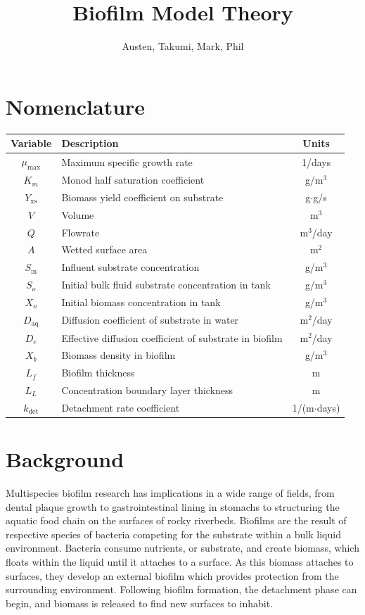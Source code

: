 \documentclass[letterpaper, twoside]{article}
\title{Biofilm Model Theory}
\author{Austen, Takumi, Mark, Phil}
\date{}
\numberwithin{equation}{section}
\begin{document}
\maketitle
{}

\section{Nomenclature}
\begin{tabular}{c l c}
  Variable & Description & Units\\ \hline
  $\mu_\mathrm{max}$  & Maximum specific growth rate & 1/days\\
  $K_m$ & Monod half saturation coefficient & g/m$^3$\\
  $Y_\mathrm{xs}$ & Biomass yield coefficient on substrate & g$\cdot$g/s\\
  $V$ & Volume &m$^3$ \\
  $Q$	& Flowrate & m$^3$/day\\
  $A$	& Wetted surface area & m$^2$\\
  $S_{\mathrm{in}}$ & Influent substrate concentration &  g/m$^3$ \\
  $S_o$ & Initial bulk fluid substrate concentration in tank &  g/m$^3$ \\
  $X_o$ & Initial biomass concentration in tank &  g/m$^3$ \\
  $D_\mathrm{aq}$ & Diffusion coefficient of substrate in water & m$^2$/day \\
  $D_e$ & Effective diffusion coefficient of substrate in biofilm & m$^2$/day \\
  $X_b$ & Biomass density in biofilm &  g/m$^3$ \\
  $L_{f}$ & Biofilm thickness & m\\
  $L_L$ & Concentration boundary layer thickness & m \\
  $k_\mathrm{det}$ &	Detachment rate coefficient & 1/(m$\cdot$days)
\end{tabular}

\section{Background}
Multispecies biofilm research has implications in a wide range of fields, from dental plaque growth to gastrointestinal lining in stomachs to structuring the aquatic food chain on the surfaces of rocky riverbeds. Biofilms are the result of respective species of bacteria competing for the substrate within a bulk liquid environment. Bacteria consume nutrients, or substrate, and create biomass, which floats within the liquid until it attaches to a surface. As this biomass attaches to surfaces, they develop an external biofilm which provides protection from the surrounding environment. Following biofilm formation, the detachment phase can begin, and biomass is released to find new surfaces to inhabit.
\end{document}
